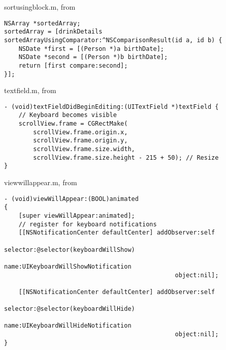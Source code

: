 \documentclass{sfuthesis}
\begin{document}
\begin{appendices}
\begin{listing}
\caption{sortusingblock.m, from \cite{so805547}}
\begin{verbatim}
NSArray *sortedArray;
sortedArray = [drinkDetails sortedArrayUsingComparator:^NSComparisonResult(id a, id b) {
    NSDate *first = [(Person *)a birthDate];
    NSDate *second = [(Person *)b birthDate];
    return [first compare:second];
}];
\end{verbatim}
\end{listing}

\begin{listing}
\caption{textfield.m, from \cite{so1126726}}
\begin{verbatim}
- (void)textFieldDidBeginEditing:(UITextField *)textField { 
    // Keyboard becomes visible
    scrollView.frame = CGRectMake(
        scrollView.frame.origin.x, 
        scrollView.frame.origin.y, 
        scrollView.frame.size.width,
        scrollView.frame.size.height - 215 + 50); // Resize
}
\end{verbatim}
\end{listing}

\begin{listing}
\caption{viewwillappear.m, from \cite{so1126726}}
\begin{verbatim}
- (void)viewWillAppear:(BOOL)animated
{
    [super viewWillAppear:animated];
    // register for keyboard notifications
    [[NSNotificationCenter defaultCenter] addObserver:self
                                             selector:@selector(keyboardWillShow)
                                                 name:UIKeyboardWillShowNotification
                                               object:nil];

    [[NSNotificationCenter defaultCenter] addObserver:self
                                             selector:@selector(keyboardWillHide)
                                                 name:UIKeyboardWillHideNotification
                                               object:nil];
}
\end{verbatim}
\end{listing}
	
\end{appendices}
\end{document}
